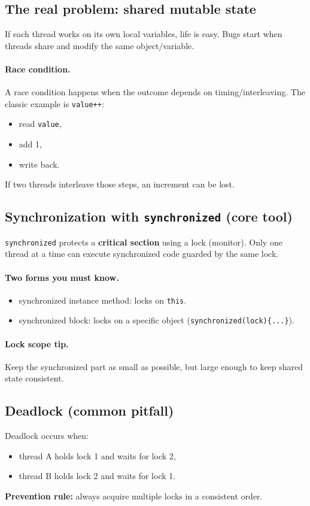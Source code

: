 \documentclass[11pt]{article}
\begin{document}
\subsection{The real problem: shared mutable state}
If each thread works on its own local variables, life is easy.
Bugs start when threads share and modify the same object/variable.

\paragraph{Race condition.}
A race condition happens when the outcome depends on timing/interleaving.
The classic example is \texttt{value++}:
\begin{itemize}
  \item read \texttt{value},
  \item add 1,
  \item write back.
\end{itemize}
If two threads interleave those steps, an increment can be lost.

\subsection{Synchronization with \texttt{synchronized} (core tool)}
\texttt{synchronized} protects a \textbf{critical section} using a lock (monitor).
Only one thread at a time can execute synchronized code guarded by the same lock.

\paragraph{Two forms you must know.}
\begin{itemize}
  \item synchronized instance method: locks on \texttt{this}.
  \item synchronized block: locks on a specific object (\texttt{synchronized(lock)\{...\}}).
\end{itemize}

\paragraph{Lock scope tip.}
Keep the synchronized part as small as possible, but large enough to keep shared state consistent.

\subsection{Deadlock (common pitfall)}
Deadlock occurs when:
\begin{itemize}
  \item thread A holds lock 1 and waits for lock 2,
  \item thread B holds lock 2 and waits for lock 1.
\end{itemize}
\textbf{Prevention rule:} always acquire multiple locks in a consistent order.
\end{document}

